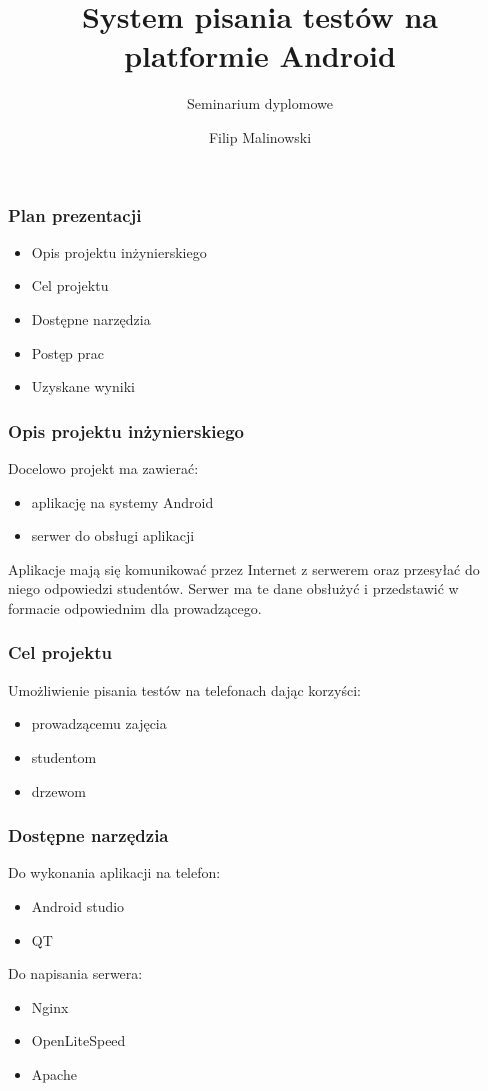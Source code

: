 \documentclass{beamer}
\title
{System pisania testów na platformie Android}
\subtitle{Seminarium dyplomowe}
\author{Filip Malinowski}
\begin{document}
  \begin{frame}
	\titlepage
  \end{frame}
  \begin{frame}
    \frametitle{Plan prezentacji}
    \begin{itemize}
    \item Opis projektu inżynierskiego
    \item Cel projektu
    \item Dostępne narzędzia
    \item Postęp prac
    \item Uzyskane wyniki
    \end{itemize}
  \end{frame}
  \begin{frame}
    \frametitle{Opis projektu inżynierskiego}
    Docelowo projekt ma zawierać:
    \begin{itemize}
    \item aplikację na systemy Android
    \item serwer do obsługi aplikacji
    \end{itemize}
    Aplikacje mają się komunikować przez Internet z serwerem oraz przesyłać do
    niego odpowiedzi studentów. Serwer ma te dane obsłużyć i przedstawić w 
    formacie odpowiednim dla prowadzącego.
    
  \end{frame}
  \begin{frame}
    \frametitle{Cel projektu}
    Umożliwienie pisania testów na telefonach dając korzyści:
    \begin{itemize}
    \item prowadzącemu zajęcia
    \item studentom
    \item drzewom
    \end{itemize}
   	
  \end{frame}
  \begin{frame}
    \frametitle{Dostępne narzędzia}
    Do wykonania aplikacji na telefon:
    \begin{itemize}
    \item Android studio
    \item QT
    \end{itemize}
    Do napisania serwera:
    \begin{itemize}
    \item Nginx
    \item OpenLiteSpeed
    \item Apache
    \end{itemize}
  \end{frame}
\end{document}
